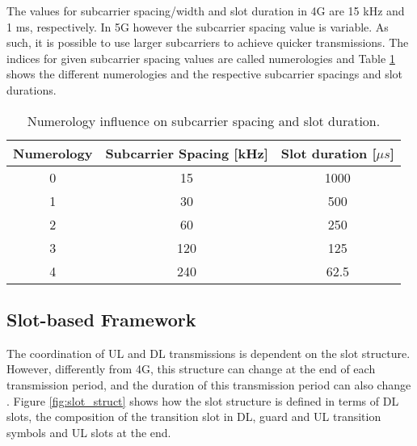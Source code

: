 The values for subcarrier spacing/width and slot duration in 4G are 15 kHz and 1 ms, respectively. In 5G however the subcarrier spacing value is variable. As such, it is possible to use larger subcarriers to achieve quicker transmissions. The indices for given subcarrier spacing values are called numerologies and Table \ref{tab:num} shows the different  numerologies and the respective subcarrier spacings and slot durations. 


\begin{table}[h]
    \centering
    \caption{Numerology influence on subcarrier spacing and slot duration.}
    \label{tab:num}
    \begin{tabular}{|c|c|c|}
    \hline
    Numerology & Subcarrier Spacing {[}kHz{]} & Slot duration {[}$\mu s${]} \\ \hline
    0          & 15                           & 1000                        \\ \hline
    1          & 30                           & 500                         \\ \hline
    2          & 60                           & 250                         \\ \hline
    3          & 120                          & 125                         \\ \hline
    4          & 240                          & 62.5                        \\ \hline
    \end{tabular}
\end{table}


\subsection*{Slot-based Framework}

The coordination of \ac{UL} and \ac{DL} transmissions is dependent on the slot structure. However, differently from 4G, this structure can change at the end of each transmission period, and the duration of this transmission period can also change \cite{3gpp_slot_periodicity}. Figure \ref{fig:slot_struct} shows how the slot structure is defined in terms of DL slots, the composition of the transition slot in DL, guard and UL transition symbols and UL slots at the end.


